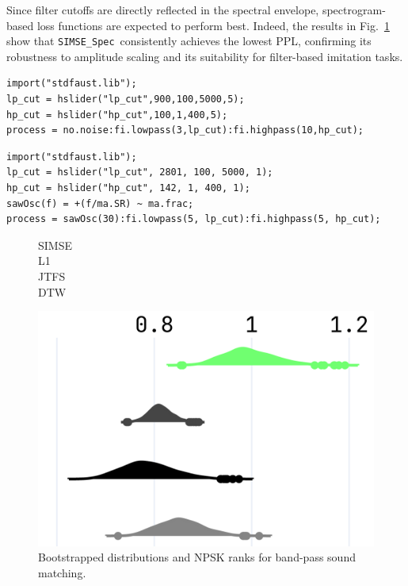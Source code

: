 \documentclass[14pt]{extarticle} %
\newcommand{\SIMSESpec}{\texttt{SIMSE\_Spec}\xspace}
\newcommand{\BPNoise}{\textbf{BP-Noise}\xspace}
\newcommand{\BPSaw}{\textbf{BP-Saw}\xspace}
\begin{document}
Since filter cutoffs are directly reflected in the spectral envelope, spectrogram-based loss functions are expected to perform best.  
Indeed, the results in Fig.~\ref{fig:npsk_BP} show that \SIMSESpec\ consistently achieves the lowest PPL, confirming its robustness to amplitude scaling and its suitability for filter-based imitation tasks.

\begin{lstlisting}[caption={\BPNoise}, label={lst:program0}, language=Faust,
float, floatplacement=!H, xleftmargin=1em, xrightmargin=0.5em, firstnumber=0, aboveskip=0em, belowskip=-1em]
import("stdfaust.lib");
lp_cut = hslider("lp_cut",900,100,5000,5);
hp_cut = hslider("hp_cut",100,1,400,5);
process = no.noise:fi.lowpass(3,lp_cut):fi.highpass(10,hp_cut);
\end{lstlisting}

\begin{lstlisting}[caption={\BPSaw}, label={lst:program0_saw}, language=Faust,
float, floatplacement=!H, xleftmargin=1em, xrightmargin=0.5em, firstnumber=0, aboveskip=0em, belowskip=-1em]
import("stdfaust.lib");
lp_cut = hslider("lp_cut", 2801, 100, 5000, 1);
hp_cut = hslider("hp_cut", 142, 1, 400, 1);
sawOsc(f) = +(f/ma.SR) ~ ma.frac;
process = sawOsc(30):fi.lowpass(5, lp_cut):fi.highpass(5, hp_cut);
\end{lstlisting}

\begin{figure}[htbp]
  \centering
  \scriptsize
  \begin{minipage}{\columnwidth}
    \begin{minipage}{0.10\columnwidth}
      \raggedleft
      \vspace{0.5cm}
      SIMSE\\[0.6cm]
      L1\\[0.65cm]
      JTFS\\[0.65cm]
      DTW
    \end{minipage}%
    \begin{minipage}{0.88\columnwidth}
      \centering
      \includegraphics[width=\linewidth]{images/npsk_ood_P_Loss_3.png}
    \end{minipage}
  \end{minipage}
  \caption{Bootstrapped distributions and NPSK ranks for band-pass sound matching.}
  \label{fig:npsk_BP}
\end{figure}
\end{document}
